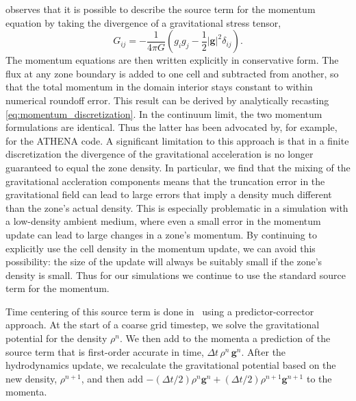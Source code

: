 \documentclass[12pt]{article}
\begin{document}
\citet[Chapter 4]{shu:1992} observes that it is possible to describe the source term 
for the momentum equation by taking the divergence of a gravitational stress tensor,
\begin{equation}
  G_{ij} = -\frac{1}{4\pi G}\left(g_i g_j - \frac{1}{2}|\mathbf{g}|^2\delta_{ij}\right).
\end{equation}
The momentum equations are then written explicitly in conservative form.
The flux at any zone boundary is added to one cell and
subtracted from another, so that the total momentum in the domain interior stays constant to
within numerical roundoff error. This result can be derived by analytically recasting 
\autoref{eq:momentum_discretization}. In the continuum limit, the two momentum
formulations are identical. Thus the latter has been advocated by, for example, 
\cite{jiang:2013} for the ATHENA code. A significant limitation to this approach is that in a finite discretization 
the divergence of the gravitational acceleration is no longer guaranteed to equal
the zone density. In particular, we find that the mixing of the gravitational accleration components
means that the truncation error in the gravitational field can lead to large errors
that imply a density much different than the zone's actual density. This is especially
problematic in a simulation with a low-density ambient medium, where even a small error 
in the momentum update can lead to large changes in a zone's momentum. By continuing to explicitly
use the cell density in the momentum update, we can avoid this possibility: the size of the update
will always be suitably small if the zone's density is small. Thus for our simulations
we continue to use the standard source term for the momentum.

Time centering of this source term is done in \castro\ using a predictor-corrector approach.
At the start of a coarse grid timestep, we solve the gravitational potential for the density $\rho^n$.
We then add to the momenta a prediction of the source term that is first-order accurate in time, 
$\Delta t\, \rho^n\, \mathbf{g}^n$. After the hydrodynamics update, we recalculate
the gravitational potential based on the new density, $\rho^{n+1}$, and then add 
$-(\Delta t/2) \rho^n \mathbf{g}^n + (\Delta t/2) \rho^{n+1} \mathbf{g}^{n+1}$ to the momenta.
\end{document}
